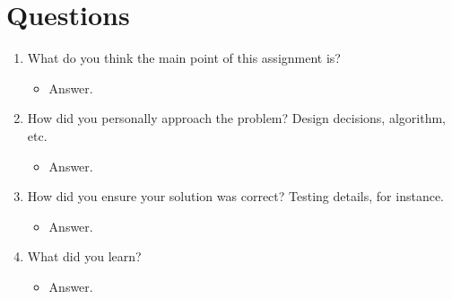 \documentclass[letterpaper,10pt,onecolumn]{IEEEtran}
\begin{document}
    \section*{Questions}
    \begin{enumerate}
        \item What do you think the main point of this assignment is?
        \begin{itemize}
            \item Answer.
        \end{itemize}
        \item How did you personally approach the problem? Design decisions, algorithm, etc.
        \begin{itemize}
            \item Answer.
        \end{itemize}
        \item How did you ensure your solution was correct? Testing details, for instance.
        \begin{itemize}
            \item Answer.
        \end{itemize}
        \item What did you learn?
        \begin{itemize}
            \item Answer.
        \end{itemize}
    \end{enumerate}
    
    
\end{document}
